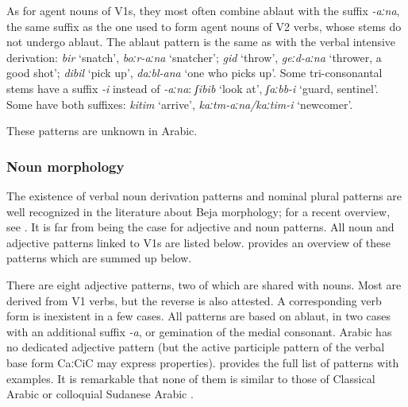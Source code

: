 \documentclass[output=paper]{langsci/langscibook}
\begin{document}
As for agent nouns of V1s, they most often combine ablaut with the suffix \textit{\nobreakdash-aːna}, the same suffix as the one used to form agent nouns of V2 verbs, whose stems do not undergo ablaut. The ablaut pattern is the same as with the verbal intensive derivation: \textit{bir} ‘snatch’, \textit{boːr-aːna} ‘snatcher’; \textit{gid} ‘throw’,\textbf{ }\textit{geːd-aːna} ‘thrower, a good shot’; \textit{dibil} ‘pick up’, \textit{daːbl-ana} ‘one who picks up’. Some tri-consonantal stems have a suffix \textit{{}-i} instead of \textit{\nobreakdash-aːna}:  \textit{ʃibib} ‘look at’, \textit{ʃaːbb\nobreakdash-i} ‘guard, sentinel'. Some have both suffixes: \textit{kitim} ‘arrive’, \textit{kaːtm-aːna/kaːtim-i} ‘newcomer’.

These patterns are unknown in Arabic.
 \subsubsection{Noun morphology}

The existence of verbal noun derivation patterns and nominal plural patterns are well recognized in the literature about Beja morphology; for a recent overview, see \citet{Appleyard2007}. It is far from being the case for adjective and noun patterns. All noun and adjective patterns linked to V1s are listed below. \citet{Vanhove2012} provides an overview of these patterns which are summed up below.

There are eight adjective patterns, two of which are shared with nouns. Most are derived from V1 verbs, but the reverse is also attested. A corresponding verb form is inexistent in a few cases. All patterns are based on ablaut, in two cases with an additional suffix \textit{\nobreakdash-a}, or gemination of the medial consonant. Arabic has no dedicated adjective pattern (but the active participle pattern of the verbal base form CaːCiC may express properties).  provides the full list of patterns with examples. It is remarkable that none of them is similar to those of Classical Arabic or colloquial Sudanese Arabic \citep[17]{Bergman2002}.
\end{document}
